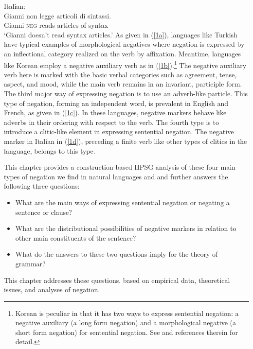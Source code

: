 \documentclass[output=paper]{langsci/langscibook}
\begin{document}
{\ex \label{1d} Italian:\\
\gll Gianni non legge articoli di sintassi. \\
Gianni \textsc{neg} reads articles of syntax \\
\glt `Gianni doesn't read syntax articles.'
\zl
%
As given in (\ref{1a}), languages like Turkish
have typical examples of morphological negatives where
negation is expressed by an inflectional category realized on the
verb by affixation. Meantime, languages like Korean
 employ a negative auxiliary verb as in (\ref{1b}).\footnote{Korean
 is peculiar in that it has two ways to
 express sentential negation: a negative auxiliary (a long form
 negation)  and a morphological negative (a short form negation)
 for sentential negation. See \citet{Kim:00,Kim:16} and references therein for detail.}
  The negative auxiliary
 verb here is marked with the basic verbal categories such as agreement, tense, aspect, and mood, while the main verb remains in an invariant, participle form. The third major way of expressing negation is to use an adverb-like
particle. This type of negation, forming an independent word, is prevalent in English and French, as given in (\ref{1c}). In these languages, negative markers behave like adverbs in their ordering with respect to the verb. The fourth
type is to introduce a clitic-like element in
expressing sentential negation. The negative marker in Italian in (\ref{1d}), preceding a finite verb like other types of clitics in the language,
belongs to this type.

This chapter provides a construction-based HPSG analysis of these four main types of negation we find in natural languages  and and further answers the
following three questions:

\begin{itemize}
\item What are the main ways of expressing sentential
negation or negating a sentence or clause?

\item What are the distributional possibilities of
negative markers in
relation to other main constituents of the sentence?

\item What do the answers to these two questions imply for
the theory of grammar?
\end{itemize}

\noindent
This chapter addresses these questions, based on empirical data,
theoretical issues, and analyses of negation.

}
\end{document}
